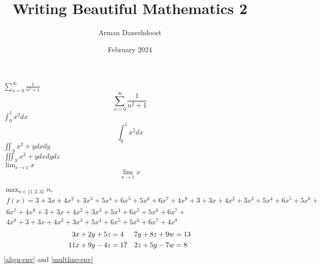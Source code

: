 \documentclass{article}
\title{Writing Beautiful Mathematics 2}
\author{Arman Daneshdoost}
\date{February 2024}
\begin{document}
	\maketitle
	$\sum_{n=0}^{\infty}\frac{1}{n^2 + 1}$
	\[\sum_{n=0}^{\infty}\frac{1}{n^2 + 1}\]
	$\int_{0}^1x^2dx$
	\[\int_{0}^1x^2dx\]
	$\iint_Sx^2+ydxdy$
	\\
	$\iiint_Sx^2+ydxdydz$
	\\
	$\lim_{x \to 1}x$
	\[\lim_{x \to 1}x\]
	\\
	$\max_{n\in \{1, 2, 3\}}n, $
	\begin{multline}\label{multline-env} %
		f(x) = 3 +3x + 4x^2 + 3x^3 + 5x^4 + 6x^5 + 5x^6 + 6x^7 + 4x^8 + 3 +3x + 4x^2 + 3x^3 + 5x^4 +  6x^5 + 5x^6 +
		\\
		 6x^7 + 4x^8 +3 +3x + 4x^2 + 3x^3 + 5x^4 + 6x^5 + 5x^6 + 6x^7 +
		 \\
		  4x^8 + 3 +3x + 4x^2 + 3x^3 + 5x^4 + 6x^5 + 5x^6 + 6x^7 + 4x^8
	\end{multline}
	\begin{align}\label{align-env}
		3x+2y+5z&=4 & 7y+8z+9w&=13 \\
		11x+9y-4z&=17 & 2z+5y-7w&=8 \notag %
	\end{align}
	\eqref{align-env} and \eqref{multline-env}
\end{document}

